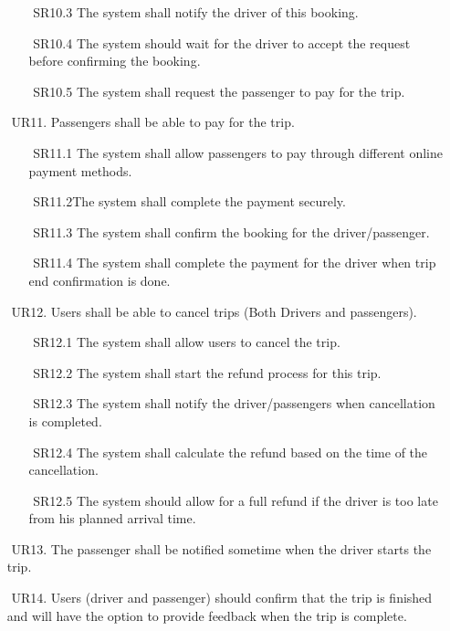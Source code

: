 \documentclass[a4paper, 12pt]{report} %
\begin{document}
\begin{itemize}
\begin{itemize}
                    \item [$ $] SR10.3 The system shall notify the driver of this booking.
                    \item [$ $] SR10.4 The system should wait for the driver to accept the request before confirming the booking.
                    \item [$ $] SR10.5 The system shall request the passenger to pay for the trip.
                \end{itemize}
                \item [$ $] UR11. Passengers shall be able to pay for the trip.
                \begin{itemize}
                    \item [$ $] SR11.1 The system shall allow passengers to pay through different online payment methods.
                    \item [$ $] SR11.2The system shall complete the payment securely.
                    \item [$ $] SR11.3 The system shall confirm the booking for the driver/passenger.
                    \item [$ $] SR11.4 The system shall complete the payment for the driver when trip end confirmation is done.
                \end{itemize}
                \item [$ $] UR12. Users shall be able to cancel trips (Both Drivers and passengers).
                \begin{itemize}
                    \item [$ $] SR12.1 The system shall allow users to cancel the trip.
                    \item [$ $] SR12.2 The system shall start the refund process for this trip.
                    \item [$ $] SR12.3 The system shall notify the driver/passengers when cancellation is completed.
                    \item [$ $] SR12.4 The system shall calculate the refund based on the time of the cancellation.
                    \item [$ $] SR12.5 The system should allow for a full refund if the driver is too late from his planned arrival time.
                \end{itemize}
                \item [$ $] UR13. The passenger shall be notified sometime when the driver starts the trip.
                \item [$ $] UR14. Users (driver and passenger) should confirm that the trip is finished and will have the option to provide feedback when the trip is complete.

\end{itemize}
\end{document}
